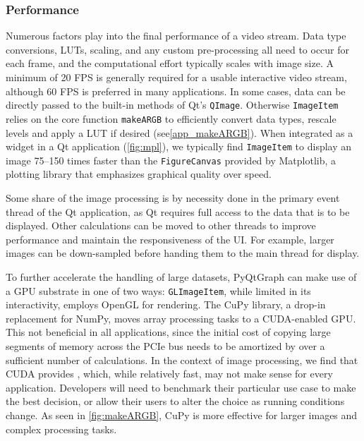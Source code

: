 \documentclass[journal]{vgtc}                %
\begin{document}
\subsubsection{Performance}

Numerous factors play into the final performance of a video stream. Data type conversions, LUTs, scaling, and any custom pre-processing all need to occur for each frame, and the computational effort typically scales with image size. A minimum of 20 FPS is generally required for a usable interactive video stream, although 60 FPS is preferred in many applications. \color{DarkOrchid} In some cases, data can be directly passed to the built-in methods of Qt's \texttt{QImage}. Otherwise \texttt{ImageItem} relies on the core function \texttt{makeARGB} to efficiently convert data types, rescale levels and apply a LUT if desired (see\autoref{app_makeARGB}). When integrated as a widget in a Qt application (\autoref{fig:mpl}), we typically find \texttt{ImageItem} to display an image 75--150 times faster than the \texttt{FigureCanvas} provided by Matplotlib, a plotting library that emphasizes graphical quality over speed.

Some share of the image processing is by necessity done in the primary event thread of the Qt application, as Qt requires full access to the data that is to be displayed. Other calculations can be moved to other threads to improve performance and maintain the responsiveness of the UI. For example, larger images can be down-sampled before handing them to the main thread for display.

\label{sec:cuda}
To further accelerate the handling of large datasets, PyQtGraph can make use of a GPU substrate in one of two ways: \texttt{GLImageItem}, while limited in its interactivity, employs OpenGL for rendering. The CuPy library, a drop-in replacement for NumPy, moves array processing tasks to a CUDA-enabled GPU. This not beneficial in all applications, since the initial cost of copying large segments of memory across the PCIe bus needs to be amortized by over a sufficient number of calculations. In the context of image processing, we find that CUDA provides   , which, while relatively fast, may not make sense for every application. Developers will need to benchmark their particular use case to make the best decision, or allow their users to alter the choice as running conditions change. As seen in \autoref{fig:makeARGB}, CuPy is more effective for larger images and complex processing tasks.
\end{document}
